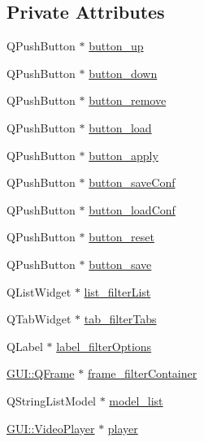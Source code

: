 \subsection*{Private Attributes}
\begin{DoxyCompactItemize}
\item 
Q\+Push\+Button $\ast$ \hyperlink{classGUI_1_1FilterTab_a7ffd636d50e89af94659d9b95f030d3a}{button\+\_\+up}
\item 
Q\+Push\+Button $\ast$ \hyperlink{classGUI_1_1FilterTab_ad858f8cd5d215c28f0f02f34d72cc2de}{button\+\_\+down}
\item 
Q\+Push\+Button $\ast$ \hyperlink{classGUI_1_1FilterTab_a3c9944c21208e29473ffc2a6d313fa84}{button\+\_\+remove}
\item 
Q\+Push\+Button $\ast$ \hyperlink{classGUI_1_1FilterTab_a73290dd82cac023039a9639ed4ee2a64}{button\+\_\+load}
\item 
Q\+Push\+Button $\ast$ \hyperlink{classGUI_1_1FilterTab_a41a7e158eeecc2ce4701674b848fb4ea}{button\+\_\+apply}
\item 
Q\+Push\+Button $\ast$ \hyperlink{classGUI_1_1FilterTab_a7c8a66ac3e3d168efff03a6da9a1ee02}{button\+\_\+save\+Conf}
\item 
Q\+Push\+Button $\ast$ \hyperlink{classGUI_1_1FilterTab_a83339040ed5dffc4a0f5b99b2a1ecf85}{button\+\_\+load\+Conf}
\item 
Q\+Push\+Button $\ast$ \hyperlink{classGUI_1_1FilterTab_a8ade1f6413d2829fcebef87d52e39904}{button\+\_\+reset}
\item 
Q\+Push\+Button $\ast$ \hyperlink{classGUI_1_1FilterTab_ac65ab223be901b07d3fb4ae0acf5f80f}{button\+\_\+save}
\item 
Q\+List\+Widget $\ast$ \hyperlink{classGUI_1_1FilterTab_a5fb61cc6e0821460452c387dab51bba3}{list\+\_\+filter\+List}
\item 
Q\+Tab\+Widget $\ast$ \hyperlink{classGUI_1_1FilterTab_ad0f0964c2d2113a68b9c59f4138e22e3}{tab\+\_\+filter\+Tabs}
\item 
Q\+Label $\ast$ \hyperlink{classGUI_1_1FilterTab_a6e618ac48cc8cd27bb7bbb1ae068dbcf}{label\+\_\+filter\+Options}
\item 
\hyperlink{classGUI_1_1QFrame}{G\+U\+I\+::\+Q\+Frame} $\ast$ \hyperlink{classGUI_1_1FilterTab_a16f45e31aa3e66824942b76aa75b4630}{frame\+\_\+filter\+Container}
\item 
Q\+String\+List\+Model $\ast$ \hyperlink{classGUI_1_1FilterTab_ac7d0d391532c07cc6745e6ef766e6b58}{model\+\_\+list}
\item 
\hyperlink{classGUI_1_1VideoPlayer}{G\+U\+I\+::\+Video\+Player} $\ast$ \hyperlink{classGUI_1_1FilterTab_a649e16c560960a5b48ca2ec6bc1a7232}{player}

\end{DoxyCompactItemize}
